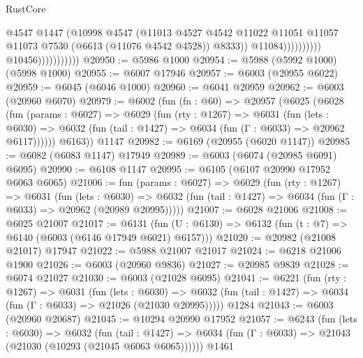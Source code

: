 \begin{lexlean}{RustCore}
\begin{coremodule}
                                              @4547
                                              @1447
                                              (@10998
                                                @4547
                                                (@11013
                                                  @4527
                                                  @4542
                                                  @11022
                                                  @11051
                                                  @11057
                                                  @11073
                                                  @7530
                                                  (@6613 (@11076 @4542 @4528))
                                                  @8333))
                                              @11084))))))))))
                          @10456)))))))))))
@20950 := @5986 @1000
@20954 := @5988 (@5992 @1000) (@5998 @1000)
@20955 := @6007 @17946
@20957 := @6003 (@20955 @6022)
@20959 := @6045 (@6046 @1000)
@20960 := @6041 @20959
@20962 := @6003 (@20960 @6070)
@20979 := @6002
    (fun (fn : @60) =>
    @20957
      (@6025
        (@6028
          (fun (params : @6027) =>
          @6029
            (fun (rty : @1267) =>
            @6031
              (fun (lets : @6030) =>
              @6032 (fun (tail : @1427) => @6034 (fun (Γ : @6033) => @20962 @6117))))))
        @6163))
    @1147
@20982 := @6169 (@20955 (@6020 @1147))
@20985 := @6082 (@6083 @1147) @17949
@20989 := @6003 (@6074 (@20985 @6091) @6095)
@20990 := @6108 @1147
@20995 := @6105 (@6107 @20990 @17952 @6063 @6065)
@21006 := fun (params : @6027) =>
  @6029
    (fun (rty : @1267) =>
    @6031
      (fun (lets : @6030) =>
      @6032 (fun (tail : @1427) => @6034 (fun (Γ : @6033) => @20962 (@20989 @20995)))))
@21007 := @6028 @21006
@21008 := @6025 @21007
@21017 := @6131
    (fun (U : @6130) => @6132 (fun (t : @7) => @6140 (@6003 (@6146 @17949 @6021) @6157)))
@21020 := @20982 (@21008 @21017) @17947
@21022 := @5988 @21007 @21017
@21024 := @6218 @21006 @1900
@21026 := @6003 (@20960 @9836)
@21027 := @20985 @9839
@21028 := @6074 @21027
@21030 := @6003 (@21028 @6095)
@21041 := @6221
    (fun (rty : @1267) =>
    @6031
      (fun (lets : @6030) =>
      @6032 (fun (tail : @1427) => @6034 (fun (Γ : @6033) => @21026 (@21030 @20995)))))
    @1284
@21043 := @6003 (@20960 @20687)
@21045 := @10294 @20990 @17952
@21057 := @6243
    (fun (lets : @6030) =>
    @6032
      (fun (tail : @1427) =>
      @6034 (fun (Γ : @6033) => @21043 (@21030 (@10293 (@21045 @6063 @6065))))))
    @1461

\end{coremodule}
\end{lexlean}
